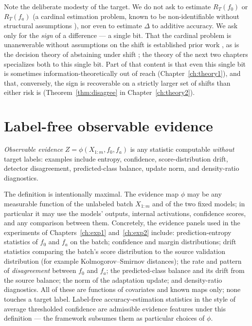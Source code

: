 Note the deliberate modesty of the target. We do not ask to estimate
$R_T(f_0)$ or $R_T(f_a)$ (a cardinal estimation problem, known to be
non-identifiable without structural assumptions
\cite{bendavid2010theory, lipton2018detecting, garg2022atc}), nor even to estimate
$\Delta$ to additive accuracy. We ask only for the \emph{sign} of a
difference --- a single bit. That the cardinal problem is unanswerable without
assumptions on the shift is established prior work \cite{garg2022atc}, as is the
decision theory of abstaining under shift \cite{kalai2021abstain}; the theory of
the next two chapters specializes both to this single bit. Part of that content is
that even this single bit is sometimes information-theoretically out of reach
(Chapter~\ref{ch:theory1}), and that, conversely, the sign is recoverable on
a strictly larger set of shifts than either risk is
(Theorem~\ref{thm:disagree} in Chapter~\ref{ch:theory2}).

\section{Label-free observable evidence}\label{sec:form-evidence}

\begin{definition}\label{def:form-evidence}
\emph{Observable evidence} $Z=\phi(X_{1:m},f_0,f_a)$ is any statistic
computable \emph{without} target labels: examples include entropy,
confidence, score-distribution drift, detector disagreement, predicted-class
balance, update norm, and density-ratio diagnostics.
\end{definition}

The definition is intentionally maximal. The evidence map $\phi$ may be any
measurable function of the unlabeled batch $X_{1:m}$ and of the two fixed
models; in particular it may use the models' outputs, internal activations,
confidence scores, and any comparison between them. Concretely, the evidence
panels used in the experiments of Chapters~\ref{ch:exp1} and~\ref{ch:exp2}
include: prediction-entropy statistics of $f_0$ and $f_a$ on the batch;
confidence and margin distributions; drift statistics comparing the batch's
score distribution to the source validation distribution (for example
Kolmogorov--Smirnov distances); the rate and pattern of \emph{disagreement}
between $f_0$ and $f_a$; the predicted-class balance and its drift from the
source balance; the norm of the adaptation update; and density-ratio
diagnostics. All of these are functions of covariates and known maps only;
none touches a target label. Label-free accuracy-estimation statistics in the
style of average thresholded confidence \cite{garg2022atc} are admissible
evidence features under this definition --- the framework subsumes them as
particular choices of $\phi$.

